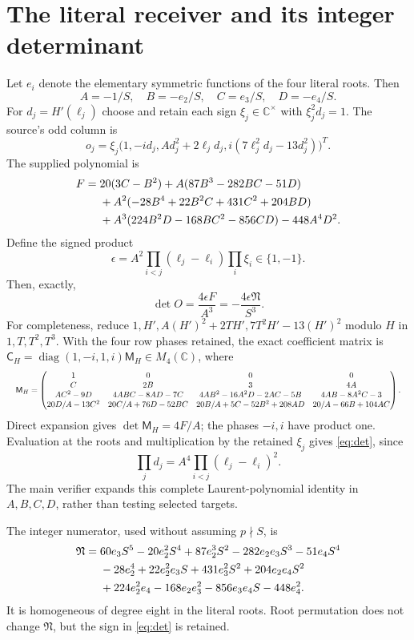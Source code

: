 \section{The literal receiver and its integer determinant}
Let $e_i$ denote the elementary symmetric functions of the four literal roots.
Then
\[
 A=-1/S,\quad B=-e_2/S,\quad C=e_3/S,\quad D=-e_4/S.
\]
For $d_j=H'(\ell_j)$ choose and retain each sign
$\xi_j\in\mathbb C^\times$ with $\xi_j^2d_j=1$. The source's odd column is
\[
 o_j=\xi_j\bigl(1,-i d_j,A d_j^2+2\ell_jd_j,
                    i(7\ell_j^2d_j-13d_j^2)\bigr)^T.
\]
The supplied polynomial is
\begin{align}\label{eq:F}
 F={}&20(3C-B^2)+A(87B^3-282BC-51D)\notag\\
 &+A^2(-28B^4+22B^2C+431C^2+204BD)\notag\\
 &+A^3(224B^2D-168BC^2-856CD)-448A^4D^2.
\end{align}
Define the signed product
\[
 \epsilon=A^2\prod_{i<j}(\ell_j-\ell_i)\prod_i\xi_i\in\{1,-1\}.
\]
Then, exactly,
\begin{equation}\label{eq:det}
 \det O=\frac{4\epsilon F}{A^3}
       =-\frac{4\epsilon\mathfrak N}{S^3}.
\end{equation}
For completeness, reduce $1,H',A(H')^2+2TH',7T^2H'-13(H')^2$ modulo $H$ in
$1,T,T^2,T^3$. With the four row phases retained, the exact coefficient matrix
is $\mathsf C_H=\operatorname{diag}(1,-i,1,i)\mathsf M_H\in M_4(\mathbb C)$,
where
\[
\resizebox{\textwidth}{!}{$
\mathsf M_H=
\begin{pmatrix}
1&0&0&0\\
C&2B&3&4A\\
AC^2-9D&4ABC-8AD-7C&4AB^2-16A^2D-2AC-5B&4AB-8A^2C-3\\
20D/A-13C^2&20C/A+76D-52BC&20B/A+5C-52B^2+208AD&20/A-66B+104AC
\end{pmatrix}.$}
\]
Direct expansion gives $\det\mathsf M_H=4F/A$; the phases $-i,i$ have product
one. Evaluation at the roots and multiplication by the retained $\xi_j$ gives
\eqref{eq:det}, since
\[
 \prod_jd_j=A^4\prod_{i<j}(\ell_j-\ell_i)^2.
\]
The main verifier expands this complete Laurent-polynomial identity in
$A,B,C,D$, rather than testing selected targets.

The integer numerator, used without assuming $p\nmid S$, is
\begin{align}\label{eq:N}
\mathfrak N={}&60e_3S^5-20e_2^2S^4+87e_2^3S^2-282e_2e_3S^3-51e_4S^4\notag\\
&-28e_2^4+22e_2^2e_3S+431e_3^2S^2+204e_2e_4S^2\notag\\
&+224e_2^2e_4-168e_2e_3^2-856e_3e_4S-448e_4^2.
\end{align}
It is homogeneous of degree eight in the literal roots. Root permutation does
not change $\mathfrak N$, but the sign in \eqref{eq:det} is retained.

